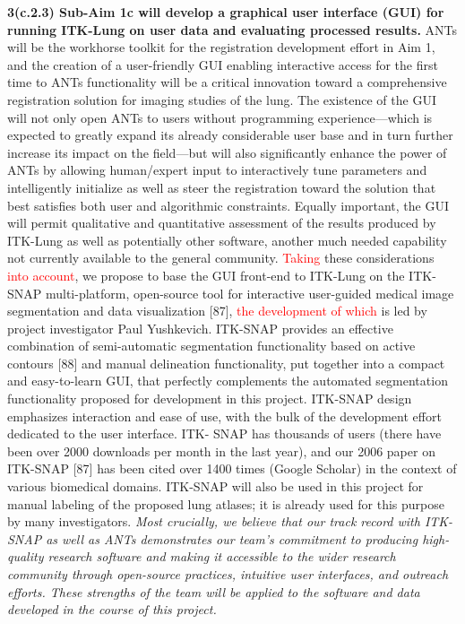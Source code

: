 \documentclass[11pt,]{article}
\begin{document}
\textbf{3(c.2.3) Sub-Aim 1c will develop a graphical user interface
(GUI) for running ITK-Lung on user data and evaluating processed
results.} ANTs will be the workhorse toolkit for the registration
development effort in Aim 1, and the creation of a user-friendly GUI
enabling interactive access for the first time to ANTs functionality
will be a critical innovation toward a comprehensive registration
solution for imaging studies of the lung. The existence of the GUI will
not only open ANTs to users without programming experience---which is
expected to greatly expand its already considerable user base and in
turn further increase its impact on the field---but will also
significantly enhance the power of ANTs by allowing human/expert input
to interactively tune parameters and intelligently initialize as well as
steer the registration toward the solution that best satisfies both user
and algorithmic constraints. Equally important, the GUI will permit
qualitative and quantitative assessment of the results produced by
ITK-Lung as well as potentially other software, another much needed
capability not currently available to the general community.
\textcolor{red}{Taking} these considerations
\textcolor{red}{into account}, we propose to base the GUI front-end to
ITK-Lung on the ITK-SNAP multi-platform, open-source tool for
interactive user-guided medical image segmentation and data
visualization {[}87{]}, \textcolor{red}{the development of which} is led
by project investigator Paul Yushkevich. ITK-SNAP provides an effective
combination of semi-automatic segmentation functionality based on active
contours {[}88{]} and manual delineation functionality, put together
into a compact and easy-to-learn GUI, that perfectly complements the
automated segmentation functionality proposed for development in this
project. ITK-SNAP design emphasizes interaction and ease of use, with
the bulk of the development effort dedicated to the user interface. ITK-
SNAP has thousands of users (there have been over 2000 downloads per
month in the last year), and our 2006 paper on ITK-SNAP {[}87{]} has
been cited over 1400 times (Google Scholar) in the context of various
biomedical domains. ITK-SNAP will also be used in this project for
manual labeling of the proposed lung atlases; it is already used for
this purpose by many investigators. \emph{Most crucially, we believe
that our track record with ITK-SNAP as well as ANTs demonstrates our
team's commitment to producing high-quality research software and making
it accessible to the wider research community through open-source
practices, intuitive user interfaces, and outreach efforts. These
strengths of the team will be applied to the software and data developed
in the course of this project.}
\end{document}
